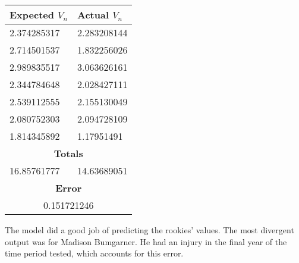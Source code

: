 \documentclass[12pt]{article}
\begin{document}
\begin{center}
\begin{tabular}{ |p{2.5cm}||p{2cm}|  }
\hline
Expected $V_n$ & Actual $V_n$ \\
\hline
 2.374285317 & 2.283208144   \\
\hline
2.714501537 &   1.832256026 \\
\hline
2.989835517 & 3.063626161  \\
\hline
2.344784648  & 2.028427111  \\
\hline
2.539112555 & 2.155130049  \\
 \hline
 2.080752303 & 2.094728109  \\
 \hline
 1.814345892 & 1.17951491  \\
 \hline
 \multicolumn{2}{|c|}{\textbf{Totals}} \\
 \hline
 16.85761777 & 14.63689051 \\
 \hline
 \multicolumn{2}{|c|}{\textbf{Error}} \\
 \hline
  \multicolumn{2}{|c|}{0.151721246} \\
 \hline
 \end{tabular}
 \end{center}
 The model did a good job of predicting the rookies' values.  The most divergent output was for Madison Bumgarner.  He had an injury in the final year of the time period tested, which accounts for this error. \\
\end{document}
